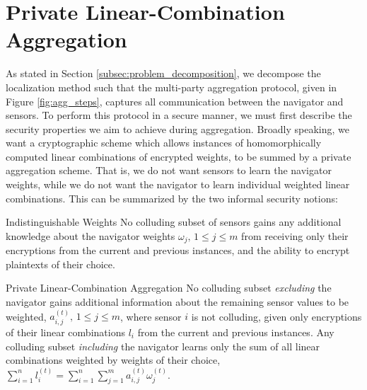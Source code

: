 \documentclass[10pt,letterpaper,oneside,twocolumn,journal]{IEEEtran}
\theoremstyle{definition}
\theoremstyle{definition}
\theoremstyle{remark}
\begin{document}
% 
%                                                                                     
%                                                                                     
%                                                                                     
% 

\section{Private Linear-Combination Aggregation} \label{sec:lcao_definition}
As stated in Section \ref{subsec:problem_decomposition}, we decompose the localization method such that the multi-party aggregation protocol, given in Figure \ref{fig:agg_steps}, captures all communication between the navigator and sensors. To perform this protocol in a secure manner, we must first describe the security properties we aim to achieve during aggregation. Broadly speaking, we want a cryptographic scheme which allows instances of homomorphically computed linear combinations of encrypted weights, to be summed by a private aggregation scheme. That is, we do not want sensors to learn the navigator weights, while we do not want the navigator to learn individual weighted linear combinations. This can be summarized by the two informal security notions:
\begin{LaTeXdescription}
    \item[Indistinguishable Weights] No colluding subset of sensors gains any additional knowledge about the navigator weights $\omega_j,\,1\leq j \leq m$ from receiving only their encryptions from the current and previous instances, and the ability to encrypt plaintexts of their choice.
    \item[Private Linear-Combination Aggregation] No colluding subset \textit{excluding} the navigator gains additional information about the remaining sensor values to be weighted, $a^{(t)}_{i,j},\,1\leq j\leq m$, where sensor $i$ is not colluding, given only encryptions of their linear combinations $l_i$ from the current and previous instances. Any colluding subset \textit{including} the navigator learns only the sum of all linear combinations weighted by weights of their choice, $\sum^{n}_{i=1}l_i^{(t)}=\sum^{n}_{i=1}\sum^{m}_{j=1} a^{(t)}_{i,j}\omega^{(t)}_j$.
\end{LaTeXdescription}
\end{document}
